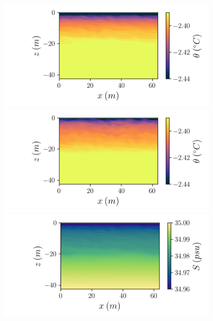 \documentclass[draft]{agujournal2019}
\begin{document}
\begin{figure}[]
    \centering
    \begin{minipage}{0.45\textwidth}
        \includegraphics[trim={1cm 0 3cm 0},clip,width=\textwidth]{Figures/pt_slope01_xz_y64_zmax42_t40.png}
    \end{minipage}%
    \begin{minipage}{0.55\textwidth}
        \includegraphics[trim={1.5cm 0 0.5cm 0},clip,width=\textwidth]{Figures/pt_slope1_xz_y64_zmax42_t40.png}
    \end{minipage}
    \begin{minipage}{0.45\textwidth}
        \includegraphics[trim={1cm 0 3cm 0}, clip, width=\textwidth]{Figures/sa_slope01_xz_y64_zmax42_t40.png}

\end{minipage}
\end{figure}
\end{document}
